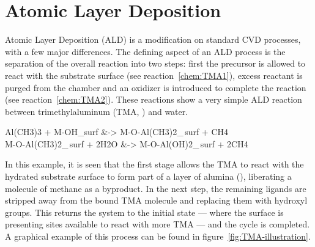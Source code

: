 \section{Atomic Layer Deposition}
\label{sec:Synth-ALD}
	
Atomic Layer Deposition (ALD) is a modification on standard CVD processes, with a few major differences. The defining aspect of an ALD process is the separation of the overall reaction into two steps: first the precursor is allowed to react with the substrate surface (see reaction~\ref{chem:TMA1}), excess reactant is purged from the chamber and an oxidizer is introduced to complete the reaction (see reaction~\ref{chem:TMA2}). These reactions show a very simple ALD reaction between trimethylaluminum (TMA, ) and water. 

\begin{reactions}
	Al(CH3)3 + M-OH_{surf} &-> M-O-Al(CH3)2_{\,surf} + CH4 \label{chem:TMA1}%
		\\
	M-O-Al(CH3)2_{\,surf} + 2H2O &-> M-O-Al(OH)2_{\,surf} + 2CH4 \label{chem:TMA2}%
\end{reactions}


In this example, it is seen that the first stage allows the TMA to react with the hydrated substrate surface to form part of a layer of alumina (), liberating a molecule of methane as a byproduct. In the next step, the remaining ligands are stripped away from the bound TMA molecule and replacing them with hydroxyl groups. This returns the system to the initial state --- where the surface is presenting sites available to react with more TMA --- and the cycle is completed. A graphical example of this process can be found in figure~\ref{fig:TMA-illustration}.


